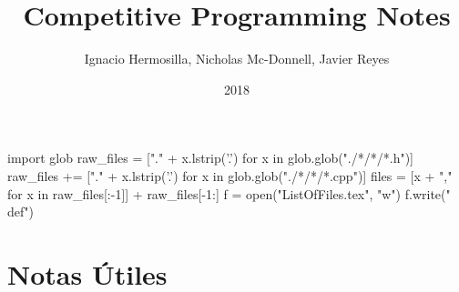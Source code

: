 \documentclass[letterpaper]{article}
\title{Competitive Programming Notes}
\author{Ignacio Hermosilla, Nicholas Mc-Donnell, Javier Reyes}
\date{2018}
\begin{document}
\maketitle

\begin{python}
	import glob
	raw_files = ["." + x.lstrip('.') for x in glob.glob("./*/*/*.h")]
	raw_files += ["." + x.lstrip('.') for x in glob.glob("./*/*/*.cpp")]
	files = [x + "," for x in raw_files[:-1]] + raw_files[-1:]
	f = open("ListOfFiles.tex", "w")
	f.write("\\def{}")
\end{python}



\tableofcontents
\newpage
\section{Notas Útiles}
\end{document}
